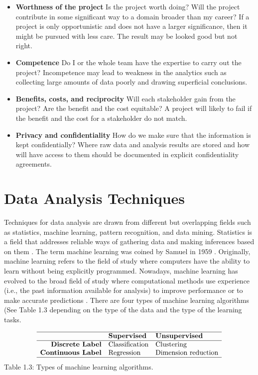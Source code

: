 \documentclass[]{book}
\theoremstyle{definition}
\theoremstyle{definition}
\theoremstyle{definition}
\theoremstyle{remark}
\begin{document}
\begin{itemize}
\item
  \textbf{Worthness of the project} Is the project worth doing? Will the
  project contribute in some significant way to a domain broader than my
  career? If a project is only opportunistic and does not have a larger
  significance, then it might be pursued with less care. The result may
  be looked good but not right.
\item
  \textbf{Competence} Do I or the whole team have the expertise to carry
  out the project? Incompetence may lead to weakness in the analytics
  such as collecting large amounts of data poorly and drawing
  superficial conclusions.
\item
  \textbf{Benefits, costs, and reciprocity} Will each stakeholder gain
  from the project? Are the benefit and the cost equitable? A project
  will likely to fail if the benefit and the cost for a stakeholder do
  not match.
\item
  \textbf{Privacy and confidentiality} How do we make sure that the
  information is kept confidentially? Where raw data and analysis
  results are stored and how will have access to them should be
  documented in explicit confidentiality agreements.
\end{itemize}

\section{Data Analysis Techniques}\label{data-analysis-techniques}

Techniques for data analysis are drawn from different but overlapping
fields such as statistics, machine learning, pattern recognition, and
data mining. Statistics is a field that addresses reliable ways of
gathering data and making inferences based on them
\citep{bandyo2011, bluman2012}. The term machine learning was coined by
Samuel in 1959 \citep{samuel1959ml}. Originally, machine learning refers
to the field of study where computers have the ability to learn without
being explicitly programmed. Nowadays, machine learning has evolved to
the broad field of study where computational methods use experience
(i.e., the past information available for analysis) to improve
performance or to make accurate predictions
\citep{bishop2007, clarke2009, mohri2012, kubat2017}. There are four
types of machine learning algorithms (See Table 1.3 depending on the
type of the data and the type of the learning tasks.

\[\begin{matrix}
\begin{array}{rll} \hline
& \textbf{Supervised} & \textbf{Unsupervised} \\\hline
\textbf{Discrete Label} & \text{Classification} & \text{Clustering} \\
\textbf{Continuous Label} & \text{Regression} & \text{Dimension reduction} \\
\hline
\end{array}
\end{matrix}
\] Table 1.3: Types of machine learning algorithms.
\end{document}
